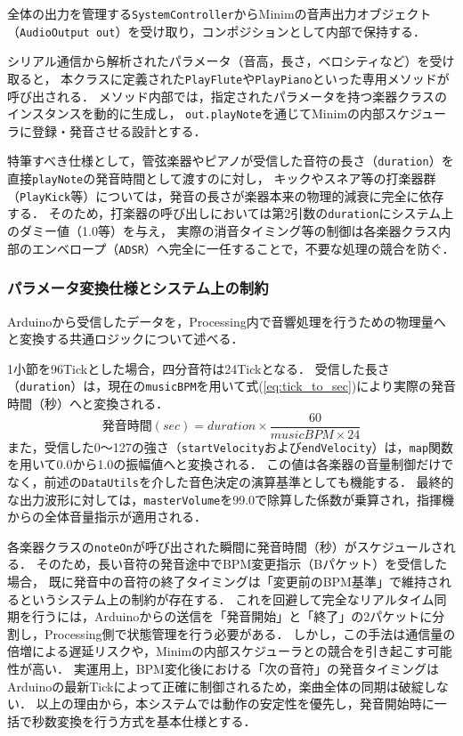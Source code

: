 \documentclass[lualatex,book,paper=a4paper,jafontsize=11.5pt,jafontscale=1.05]{jlreq}
\begin{document}
全体の出力を管理する\texttt{SystemController}からMinimの音声出力オブジェクト（\texttt{AudioOutput out}）を受け取り，コンポジションとして内部で保持する．

シリアル通信から解析されたパラメータ（音高，長さ，ベロシティなど）を受け取ると，
本クラスに定義された\texttt{PlayFlute}や\texttt{PlayPiano}といった専用メソッドが呼び出される．
メソッド内部では，指定されたパラメータを持つ楽器クラスのインスタンスを動的に生成し，
\texttt{out.playNote}を通じてMinimの内部スケジューラに登録・発音させる設計とする．

特筆すべき仕様として，管弦楽器やピアノが受信した音符の長さ（\texttt{duration}）を直接\texttt{playNote}の発音時間として渡すのに対し，
キックやスネア等の打楽器群（\texttt{PlayKick}等）については，発音の長さが楽器本来の物理的減衰に完全に依存する．
そのため，打楽器の呼び出しにおいては第2引数の\texttt{duration}にシステム上のダミー値（1.0等）を与え，
実際の消音タイミング等の制御は各楽器クラス内部のエンベロープ（\texttt{ADSR}）へ完全に一任することで，不要な処理の競合を防ぐ．



\subsubsection{パラメータ変換仕様とシステム上の制約}

Arduinoから受信したデータを，Processing内で音響処理を行うための物理量へと変換する共通ロジックについて述べる．

1小節を96Tickとした場合，四分音符は24Tickとなる．
受信した長さ（\texttt{duration}）は，現在の\texttt{musicBPM}を用いて式(\ref{eq:tick_to_sec})により実際の発音時間（秒）へと変換される．
\begin{equation}
    発音時間(sec) = duration \times \frac{60}{musicBPM \times 24} \label{eq:tick_to_sec}
\end{equation}
また，受信した0〜127の強さ（\texttt{startVelocity}および\texttt{endVelocity}）は，\texttt{map}関数を用いて0.0から1.0の振幅値へと変換される．
この値は各楽器の音量制御だけでなく，前述の\texttt{DataUtils}を介した音色決定の演算基準としても機能する．
最終的な出力波形に対しては，\texttt{masterVolume}を99.0で除算した係数が乗算され，指揮機からの全体音量指示が適用される．

各楽器クラスの\texttt{noteOn}が呼び出された瞬間に発音時間（秒）がスケジュールされる．
そのため，長い音符の発音途中でBPM変更指示（Bパケット）を受信した場合，
既に発音中の音符の終了タイミングは「変更前のBPM基準」で維持されるというシステム上の制約が存在する．
これを回避して完全なリアルタイム同期を行うには，Arduinoからの送信を「発音開始」と「終了」の2パケットに分割し，Processing側で状態管理を行う必要がある．
しかし，この手法は通信量の倍増による遅延リスクや，Minimの内部スケジューラとの競合を引き起こす可能性が高い．
実運用上，BPM変化後における「次の音符」の発音タイミングはArduinoの最新Tickによって正確に制御されるため，楽曲全体の同期は破綻しない．
以上の理由から，本システムでは動作の安定性を優先し，発音開始時に一括で秒数変換を行う方式を基本仕様とする．
\end{document}
